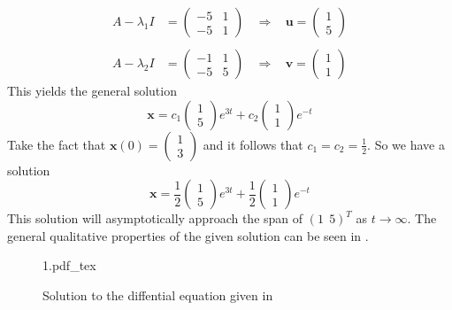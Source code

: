 \documentclass{article}
\newcommand{\incfig}[1]{%
    \def\svgwidth{.5\linewidth}
    {#1.pdf_tex}
}
\theoremstyle{definition}
\begin{document}
    \begin{align*}
        A - \lambda_1 I &= \begin{pmatrix}
            -5 & 1 \\
            -5 & 1
        \end{pmatrix} \ \ \ \ \Longrightarrow \ \ \ \ \bm u = \begin{pmatrix}
            1 \\
            5
        \end{pmatrix} \\\\
        A - \lambda_2 I &= \begin{pmatrix}
            -1 & 1 \\
            -5 & 5
        \end{pmatrix} \ \ \ \ \Longrightarrow \ \ \ \ \bm v = \begin{pmatrix}
            1 \\
            1
        \end{pmatrix}
    \end{align*}
    This yields the general solution
    \[
        \bm x = c_1 
        \begin{pmatrix}
            1 \\
            5
        \end{pmatrix}
        e^{3t} + c_2 
        \begin{pmatrix}
            1 \\
            1
        \end{pmatrix} 
        e^{-t}
    \]
    Take the fact that $\bm x (0) = \begin{pmatrix}
        1 \\
        3
    \end{pmatrix}$ and it follows that $c_1 = c_2 = \frac{1}{2}$. So we have a solution
    \[
        \bm x = \frac{1}{2}
        \begin{pmatrix}
            1 \\
            5
        \end{pmatrix}
        e^{3t} + \frac{1}{2}
        \begin{pmatrix}
            1 \\
            1
        \end{pmatrix}
        e^{-t}
    \]
    This solution will asymptotically approach the span of $(1 \ \ 5)^T$ as $t \rightarrow \infty$.
    The general qualitative properties of the given solution can be seen in .
    \begin{figure}[ht]
        \centering
        \incfig{1}
        \caption{Solution to the diffential equation given in }
        \label{fig:1}
    \end{figure}
\end{document}
